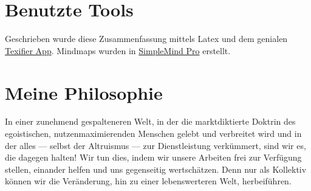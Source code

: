 \documentclass[../main.tex]{subfiles}
\begin{document}
\section{Benutzte Tools}
Geschrieben wurde diese Zusammenfassung mittels Latex und dem genialen \href{https://www.texifier.com/}{Texifier App}. Mindmaps wurden in \href{https://simplemind.eu/}{SimpleMind Pro} erstellt.   

\section{Meine Philosophie}
In einer zunehmend gespalteneren Welt, in der die marktdiktierte Doktrin des egoistischen, nutzenmaximierenden Menschen gelebt und verbreitet wird und in der alles — selbst der Altruismus — zur Dienstleistung verkümmert, sind wir es, die dagegen halten! Wir tun dies, indem wir unsere Arbeiten frei zur Verfügung stellen, einander helfen und uns gegenseitig wertschätzen. Denn nur als Kollektiv können wir die Veränderung, hin zu einer lebenswerteren Welt, herbeiführen. 
\end{document}
